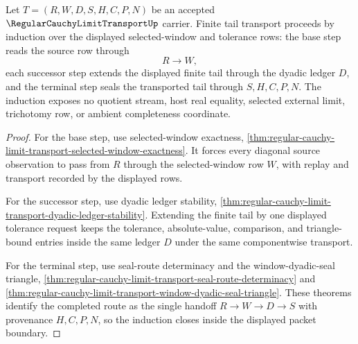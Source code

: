\begin{theorem}
\label{thm:regular-cauchy-limit-transport-tail-induction}
Let $T=(R,W,D,S,H,C,P,N)$ be an accepted $\RegularCauchyLimitTransportUp$ carrier. Finite tail transport proceeds by induction over the displayed selected-window and tolerance rows: the base step reads the source row through
$$
R \to W,
$$
each successor step extends the displayed finite tail through the dyadic ledger $D$, and the terminal step seals the transported tail through $S,H,C,P,N$. The induction exposes no quotient stream, host real equality, selected external limit, trichotomy row, or ambient completeness coordinate.
\end{theorem}
\begin{proof}
For the base step, use selected-window exactness, \autoref{thm:regular-cauchy-limit-transport-selected-window-exactness}. It forces every diagonal source observation to pass from $R$ through the selected-window row $W$, with replay and transport recorded by the displayed rows.

For the successor step, use dyadic ledger stability, \autoref{thm:regular-cauchy-limit-transport-dyadic-ledger-stability}. Extending the finite tail by one displayed tolerance request keeps the tolerance, absolute-value, comparison, and triangle-bound entries inside the same ledger $D$ under the same componentwise transport.

For the terminal step, use seal-route determinacy and the window-dyadic-seal triangle, \autoref{thm:regular-cauchy-limit-transport-seal-route-determinacy} and \autoref{thm:regular-cauchy-limit-transport-window-dyadic-seal-triangle}. These theorems identify the completed route as the single handoff $R \to W \to D \to S$ with provenance $H,C,P,N$, so the induction closes inside the displayed packet boundary.
\end{proof}


